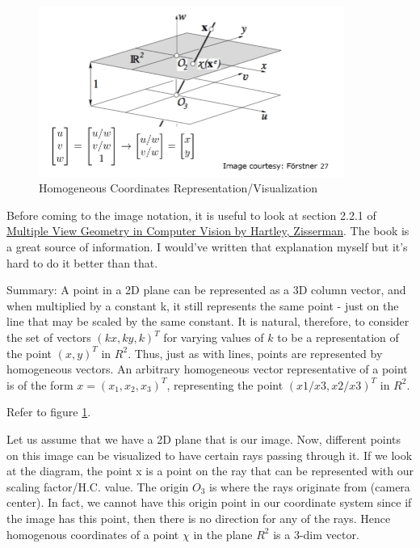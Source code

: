 \begin{figure}[t]
    \centering
    \includegraphics[width=10cm]{img/homogenous-eucclidian.png}
    \caption{Homogeneous Coordinates Representation/Visualization}
    \label{fig:hc}
\end{figure}

Before coming to the image notation, it is useful to look at section 2.2.1 of \href{https://github.com/pranjals16/cs676/blob/master/Hartley\%2C\%20Zisserman\%20-\%20Multiple\%20View\%20Geometry\%20in\%20Computer\%20Vision.pdf}{Multiple View Geometry in Computer Vision by Hartley, Zisserman}. The book is a great source of information. I would've written that explanation myself but it's hard to do it better than that.

Summary: A point in a 2D plane can be represented as a 3D column vector, and when multiplied by a constant k, it still represents the same point - just on the line that may be scaled by the same constant. It is natural, therefore, to consider the set of vectors $(kx, ky, k)^T$ for varying values of $k$ to be a representation of the point $(x, y)^T$ in $R^2$. Thus, just as with lines, points are represented by homogeneous vectors. An arbitrary homogeneous vector representative of a point is of the form $x=(x_1,x_2,x_3)^T$, representing the point $(x1/x3,x2/x3)^T$ in $R^2$. 

Refer to figure \ref{fig:hc}.

Let us assume that we have a 2D plane that is our image. Now, different points on this image can be visualized to have certain rays passing through it. If we look at the diagram, the point x is a point on the ray that can be represented with our scaling factor/H.C. value. The origin $O_3$ is where the rays originate from (camera center). In fact, we cannot have this origin point in our coordinate system since if the image has this point, then there is no direction for any of the rays. Hence homogenous coordinates of a point $\chi$ in the plane $R^2$ is a 3-dim vector.

